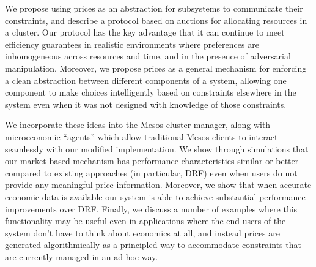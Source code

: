 \documentclass{acm_proc_article-sp}
\begin{document}
We propose using prices as an abstraction for subsystems to communicate their
constraints, and describe a protocol based on auctions for allocating resources
in a cluster. Our protocol has the key advantage that it can continue to meet
efficiency guarantees in realistic environments where preferences are
inhomogeneous across resources and time, and in the presence of adversarial
manipulation. Moreover, we propose prices as a general mechanism for enforcing a
clean abstraction between different components of a system, allowing one
component to make choices intelligently based on constraints elsewhere in the
system even when it was not designed with knowledge of those constraints.

We incorporate these ideas into the Mesos cluster manager, along with microeconomic
``agents'' which allow traditional Mesos clients to interact seamlessly with our
modified implementation. We show through simulations that our market-based mechanism has performance characteristics similar or better compared to existing approaches (in particular, DRF) even when users do not
provide any meaningful price information. Moreover, we show that when accurate
economic data is available our system is able to achieve substantial
performance improvements over DRF. Finally, we discuss a number of examples where this
functionality may be useful even in applications where the end-users of the
system don't have to think about economics at all, and instead prices are
generated algorithmically as a principled way to accommodate constraints that
are currently managed in an ad hoc way.
\end{document}
